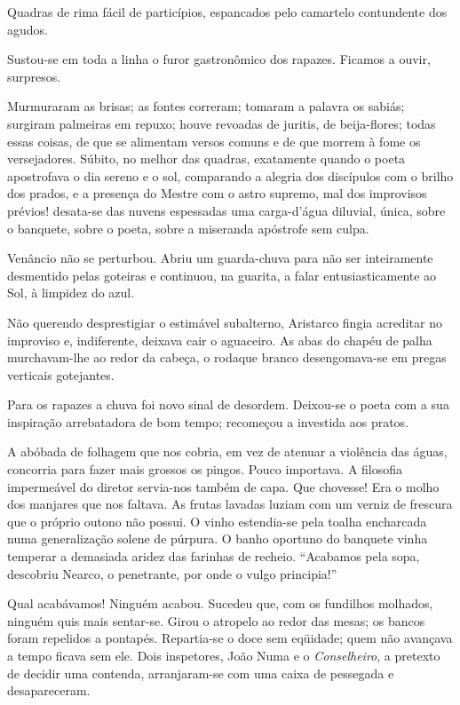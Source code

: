 Quadras de rima fácil de particípios, espancados pelo camartelo
contundente dos agudos. 

Sustou{}-se em toda a linha o furor
gastronômico dos rapazes. Ficamos a ouvir, surpresos. 

Murmuraram as brisas; as fontes correram; tomaram a palavra os sabiás; 
surgiram palmeiras em repuxo; houve revoadas de juritis, de beija{}-flores;
todas essas coisas, de que se alimentam versos comuns e de que morrem à
fome os versejadores. Súbito, no melhor das quadras, exatamente quando
o poeta apostrofava o dia sereno e o sol, comparando a alegria dos
discípulos com o brilho dos prados, e a presença do Mestre com o astro
supremo, mal dos improvisos prévios! desata{}-se das nuvens espessadas
uma carga{}-d'água diluvial, única, sobre o banquete, sobre o poeta,
sobre a miseranda apóstrofe sem culpa. 

Venâncio não se perturbou. Abriu
um guarda{}-chuva para não ser inteiramente desmentido pelas goteiras e
continuou, na guarita, a falar entusiasticamente ao Sol, à limpidez do
azul. 


Não querendo desprestigiar o estimável subalterno, Aristarco
fingia acreditar no improviso e, indiferente, deixava cair o aguaceiro.
As abas do chapéu de palha murchavam{}-lhe ao redor da cabeça, o
rodaque branco desengomava{}-se em pregas verticais gotejantes. 

Para os rapazes a chuva foi novo sinal de desordem. Deixou{}-se o poeta com a
sua inspiração arrebatadora de bom tempo; recomeçou a investida aos
pratos. 

A abóbada de folhagem que nos cobria, em vez de atenuar a
violência das águas, concorria para fazer mais grossos os pingos. Pouco
importava. A filosofia impermeável do diretor servia{}-nos também de
capa. Que chovesse! Era o molho dos manjares que nos faltava. As frutas
lavadas luziam com um verniz de frescura que o próprio outono não
possui. O vinho estendia{}-se pela toalha encharcada numa generalização
solene de púrpura. O banho oportuno do banquete vinha temperar a
demasiada aridez das farinhas de recheio. ``Acabamos pela sopa,
descobriu Nearco, o penetrante, por onde o vulgo principia!'' 

Qual acabávamos! Ninguém acabou. Sucedeu que, com os fundilhos molhados,
ninguém quis mais sentar{}-se. Girou o atropelo ao redor das mesas; os
bancos foram repelidos a pontapés. Repartia{}-se o doce sem eqüidade;
quem não avançava a tempo ficava sem ele. Dois inspetores, João Numa e
o \textit{Conselheiro}, a pretexto de decidir uma contenda, arranjaram{}-se com
uma caixa de pessegada e desapareceram. 

